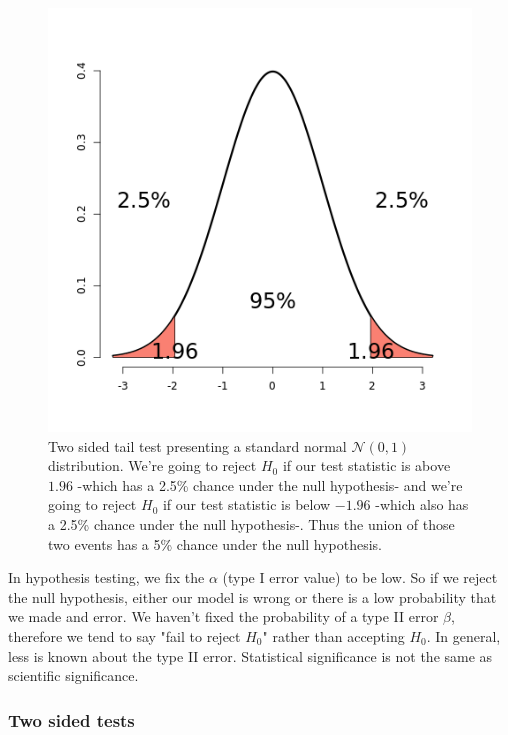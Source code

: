 \documentclass{homework}
\begin{document}
\begin{figure}
    \centering
    \includegraphics[scale = 0.4]{figs/two sided tail test.png}
    \caption{Two sided tail test presenting a standard normal $\mathcal{N}(0,1)$ distribution. We're going to reject $H_0$ if our test statistic is above $1.96$ -which has a 2.5\% chance under the null hypothesis- and we're going to reject $H_0$ if our test statistic is below $-1.96$ -which also has a 2.5\% chance under the null hypothesis-. Thus the union of those two events has a 5\% chance under the null hypothesis. }
    \label{fig:my_label}
\end{figure}

In hypothesis testing, we fix the $\alpha$ (type I error value) to be low. So if we reject the null hypothesis, either our model is wrong or there is a low probability that we made and error. We haven't fixed the probability of a type II error $\beta$, therefore we tend to say "fail to reject $H_0$" rather than accepting $H_0$. In general, less is known about the type II error. Statistical significance is not the same as scientific significance. 

\clearpage

\subsubsection{Two sided tests}
\end{document}
